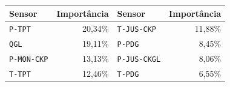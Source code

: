\begin{tabular}{lr@{\qquad}lr}
\toprule
Sensor & Importância & Sensor & Importância \\
\midrule
\texttt{P-TPT} & 20,34\% & \texttt{T-JUS-CKP} & 11,88\% \\
\texttt{QGL} & 19,11\% & \texttt{P-PDG} & 8,45\% \\
\texttt{P-MON-CKP} & 13,13\% & \texttt{P-JUS-CKGL} & 8,06\% \\
\texttt{T-TPT} & 12,46\% & \texttt{T-PDG} & 6,55\% \\
\bottomrule
\end{tabular}
